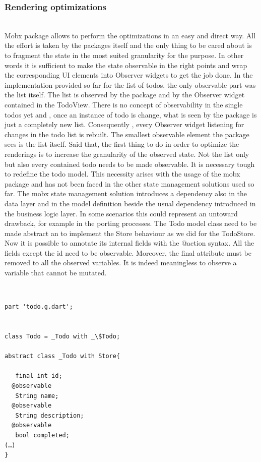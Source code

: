 \subsubsection{Rendering optimizations} \mbox{}\\ \label{par:todo_app_inherited_widget_introduction}
Mobx package allows to perform the optimizations in an easy and direct way. All the effort is taken by the packages itself and the only thing to be cared about is to fragment the state in the most suited granularity for the purpose. In other words it is sufficient to make the state observable in the right points and wrap the corresponding UI elements into Observer widgets to get the job done. In the implementation provided so far for the list of todos, the only observable part was the list itself. The list is observed by the package and by the Observer widget contained in the TodoView. There is no concept of observability in the single todos yet and , once an instance of todo is change, what is seen by the package is just a completely new list. Consequently , every Observer widget listening for changes in the todo list is rebuilt. The smallest observable element the package sees is the list itself. Said that, the first thing to do in order to optimize the renderings is to increase the granularity of the observed state. Not the list only but also every contained todo needs to be made observable. It is necessary tough to redefine the todo model. This necessity arises with the usage of the mobx package and has not been faced in the other state management solutions used so far. The mobx state management solution introduces a dependency also in the data layer and in the model definition beside the usual dependency introduced in the business logic layer. In some scenarios this could represent an untoward drawback, for example in the porting processes. The Todo model class need to be made abstract an to implement the Store behaviour as we did for the TodoStore. Now it is possible to annotate its internal fields with the @action syntax. All the fields except the id need to be observable. Moreover, the final attribute must be removed to all the observed variables. It is indeed meaningless to observe a variable that cannot be mutated.
\begin{code}
\mbox{}\\
 \mbox{}
		\label{code:2.14}
\begin{verbatim}
part 'todo.g.dart';


class Todo = _Todo with _\$Todo;

abstract class _Todo with Store{

   final int id;
  @observable
   String name;
  @observable
   String description;
  @observable
   bool completed;
(…)
}
\end{verbatim}
\mbox{}
\end{code}

